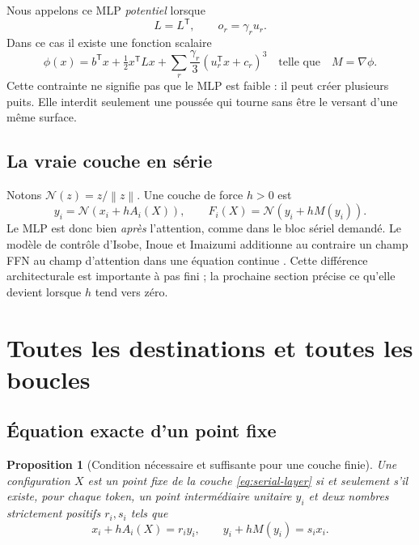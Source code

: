 \documentclass[11pt,a4paper]{article}
\newtheorem{proposition}[theorem]{Proposition}
\theoremstyle{definition}
\newcommand{\T}{\mathsf T}
\newcommand{\norm}[1]{\left\lVert #1\right\rVert}
\newcommand{\N}{\mathcal N}
\begin{document}
Nous appelons ce MLP \emph{potentiel} lorsque
\begin{equation}
 L=L^{\T},\qquad o_r=\gamma_r u_r.\label{eq:potential-constraint}
\end{equation}
Dans ce cas il existe une fonction scalaire
\begin{equation}
 \phi(x)=b^{\T}x+\tfrac12x^{\T}Lx+
 \sum_r\frac{\gamma_r}{3}(u_r^{\T}x+c_r)^3
 \quad\text{telle que}\quad M=\nabla\phi.\label{eq:mlp-potential}
\end{equation}
Cette contrainte ne signifie pas que le MLP est faible : il peut créer plusieurs
puits. Elle interdit seulement une poussée qui tourne sans être le versant d'une même
surface.

\subsection{La vraie couche en série}

Notons $\N(z)=z/\norm z$. Une couche de force $h>0$ est
\begin{equation}
 y_i=\N\!\left(x_i+hA_i(X)\right),\qquad
 F_i(X)=\N\!\left(y_i+hM(y_i)\right).\label{eq:serial-layer}
\end{equation}
Le MLP est donc bien \emph{après} l'attention, comme dans le bloc sériel demandé. Le
modèle de contrôle d'Isobe, Inoue et Imaizumi additionne au contraire un champ FFN au
champ d'attention dans une équation continue \cite{isobe2026training}. Cette
différence architecturale est importante à pas fini ; la prochaine section précise ce
qu'elle devient lorsque $h$ tend vers zéro.

\section{Toutes les destinations et toutes les boucles}
\label{sec:exact-equations}

\subsection{Équation exacte d'un point fixe}

\begin{proposition}[Condition nécessaire et suffisante pour une couche finie]
Une configuration $X$ est un point fixe de la couche \eqref{eq:serial-layer} si et
seulement s'il existe, pour chaque token, un point intermédiaire unitaire $y_i$ et deux
nombres strictement positifs $r_i,s_i$ tels que
\begin{equation}
 x_i+hA_i(X)=r_i y_i,\qquad
 y_i+hM(y_i)=s_i x_i.\label{eq:finite-fixed}
\end{equation}
\end{proposition}
\end{document}
